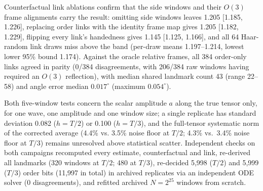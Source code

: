 \documentclass[11pt,a4paper]{article}
\begin{document}
Counterfactual link ablations confirm that the side windows and their
$O(3)$ frame alignments carry the result: omitting side windows leaves
1.205 [1.185, 1.226], replacing order links with the identity frame map
gives 1.205 [1.182, 1.229], flipping every link's handedness gives 1.145
[1.125, 1.166], and all 64 Haar-random link draws miss above the band
(per-draw means 1.197--1.214, lowest lower 95\% bound 1.174). Against the
oracle relative frames, all 384 order-only links agreed in parity
(0/384 disagreements, with 206/384 raw windows having required an $O(3)$
reflection), with median shared landmark count 43 (range 22--58) and
angle error median $0.017^\circ$ (maximum $0.054^\circ$).

Both five-window tests concern the scalar amplitude $a$ along the true
tensor only, for one wave, one amplitude and one window size; a single
replicate has standard deviation 0.082 ($h=T/2$) or 0.100 ($h=T/3$),
and the full-tensor systematic norm of the corrected average (4.4\% vs.
3.5\% noise floor at $T/2$; 4.3\% vs.\ 3.4\% noise floor at $T/3$)
remains unresolved above statistical scatter. Independent checks on both
campaigns recomputed every estimate, counterfactual and link, re-derived
all landmarks (320 windows at $T/2$; 480 at $T/3$), re-decided 5,998 ($T/2$)
and 5,999 ($T/3$) order bits (11,997 in total) in archived replicates via an
independent ODE solver (0 disagreements), and refitted archived $N=2^{25}$
windows from scratch.
\end{document}
